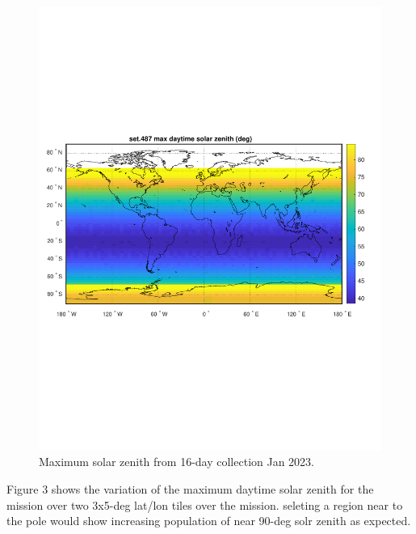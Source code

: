 \documentclass[11pt,twocolumn]{article}
\begin{document}
\begin{figure}[htbp]
\centering
\includegraphics[width=\linewidth]{./Figs/set487_max_day_solzen_global_map.pdf}
\caption{\label{fig:orgb0aa297}Maximum solar zenith from 16-day collection Jan 2023.}
\end{figure}

Figure 3 shows the variation of the maximum daytime solar zenith for the mission
over two 3x5-deg lat/lon tiles over the mission. seleting a region near to the pole
would show increasing population of near 90-deg solr zenith as expected.
\end{document}
